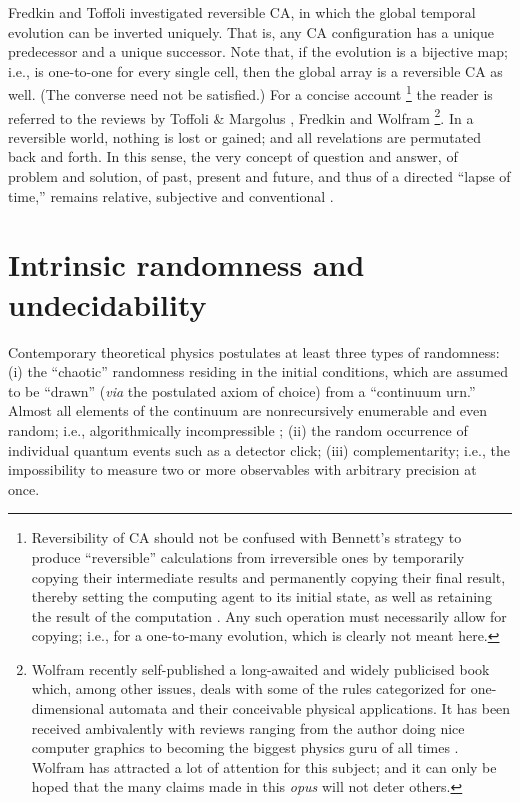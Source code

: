 \documentclass[pre,preprint,showpacs,showkeys,amsfonts]{revtex4}
\begin{document}
Fredkin and Toffoli investigated reversible CA,
in which the global temporal evolution can be inverted uniquely.
That is, any CA configuration has a unique predecessor and a unique successor.
Note that, if the evolution is a bijective map;
i.e., is one-to-one for every single cell,
then the global array is a reversible CA as well.
(The converse need not be satisfied.)
For a concise account \footnote{
Reversibility of CA should  not be confused with Bennett's strategy
to produce ``reversible'' calculations from irreversible ones
by  temporarily copying their intermediate results and permanently
copying their final result,
thereby setting the computing agent to its initial state,
as well as retaining
the result of the computation \cite{bennett-73}.
Any such operation must necessarily allow for copying; i.e., for a one-to-many evolution,
which is clearly not meant here.
}
the reader is referred to
the reviews by Toffoli \& Margolus
\cite{toffoli-margolus-90},
Fredkin
\cite{fredkin} and Wolfram
\footnote{
Wolfram  recently self-published a long-awaited and widely publicised book
which, among other issues, deals with some of the rules categorized for one-dimensional automata
\cite{wolfram-2002} and their conceivable physical applications.
It has been received ambivalently with reviews ranging from the author doing nice computer graphics
to becoming the biggest physics guru of all times
\cite{gray-2003}.
Wolfram has attracted a lot of attention for this subject;
and it can only be hoped that the many claims made in this {\it opus}
will not deter others.}.
In a reversible world, nothing is lost or gained; and all revelations are
permutated back and forth.
In this sense, the very concept of question and answer, of problem and solution,
of past, present and future, and thus of a directed ``lapse of time,''
remains relative, subjective and conventional
\cite{godel-sch}.



\section{Intrinsic randomness and undecidability}

Contemporary theoretical physics postulates at least three types
of randomness:
(i) the ``chaotic'' randomness residing in the initial conditions,
which are assumed to be ``drawn'' ({\it via} the postulated axiom of choice)
from a ``continuum urn.''
Almost all elements of the continuum are
nonrecursively enumerable and even random; i.e., algorithmically incompressible
\cite{chaitin3,chaitin:01,calude:02};
(ii) the random occurrence of individual quantum events such as a detector click;
(iii) complementarity; i.e., the impossibility to measure two or more
observables with arbitrary precision at once.
\end{document}
